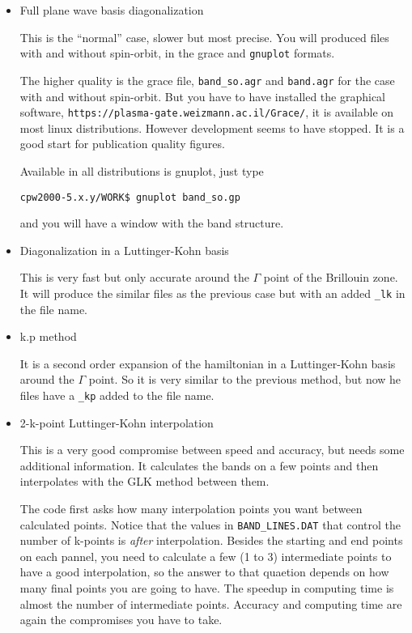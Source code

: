 \documentclass[11pt]{article}
\begin{document}
\begin{itemize}

   \item{Full plane wave basis diagonalization}

   This is the ``normal'' case,  slower but most precise.
   You will produced files with and without spin-orbit,
   in the {\sc grace} and \texttt{gnuplot} formats.

   The higher quality is the {\sc grace} file, \texttt{band\_so.agr} and \texttt{band.agr}
   for the case with and without spin-orbit.  But you have to have installed the graphical software,
   \texttt{https://plasma-gate.weizmann.ac.il/Grace/}, it is available on most linux distributions.
   However development seems to have stopped.
   It is a good start for publication quality figures.

   Available in all distributions is gnuplot, just type

   \noindent\texttt{cpw2000-5.x.y/WORK\$ gnuplot band\_so.gp}

   and you will have a window with the band structure.

   \item{Diagonalization in a Luttinger-Kohn basis}

   This is very fast but only accurate around the $\Gamma$ point of the Brillouin zone.
   It will produce the similar files as the previous case but with an added \texttt{\_lk}
   in the file name.

   \item{k.p method}

   It is a second order expansion of the hamiltonian in a Luttinger-Kohn basis
   around the $\Gamma$ point.  So it is very similar to the previous method,
   but now he files have a \texttt{\_kp} added to the file name.

   \item{2-k-point Luttinger-Kohn interpolation}

   This is a very good compromise between speed and accuracy, but needs some additional
   information.  It calculates the bands on a few points and then interpolates
   with the GLK method between them.

   The code first asks how many interpolation points you want between calculated points.
   Notice that the values in \texttt{BAND\_LINES.DAT} that control the number of k-points
   is {\it after} interpolation.  Besides the starting and end points on each pannel,
   you need to calculate a few (1 to 3) intermediate points to have a good interpolation,
   so the answer to that quaetion depends on how many final points you are going to have.
   The speedup in computing time is almost the number of intermediate points.
   Accuracy and computing time are again the compromises you have to take.


\end{itemize}
\end{document}
